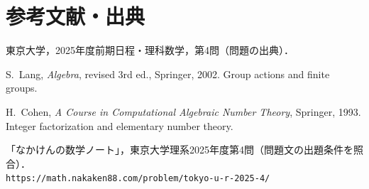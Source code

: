 \documentclass[a5paper,10pt,onecolumn]{jsarticle}
\theoremstyle{mathnotetheorem}
\begin{document}
\section*{参考文献・出典}
\begin{enumerate}[label={[\arabic*]}]
\item 東京大学，2025年度前期日程・理科数学，第4問（問題の出典）．
\item S.~Lang, \textit{Algebra}, revised 3rd ed., Springer, 2002. Group actions and finite groups.
\item H.~Cohen, \textit{A Course in Computational Algebraic Number Theory}, Springer, 1993. Integer factorization and elementary number theory.
\item 「なかけんの数学ノート」，東京大学理系2025年度第4問（問題文の出題条件を照合）．\\
\texttt{https://math.nakaken88.com/problem/tokyo-u-r-2025-4/}
\end{enumerate}
\end{document}
